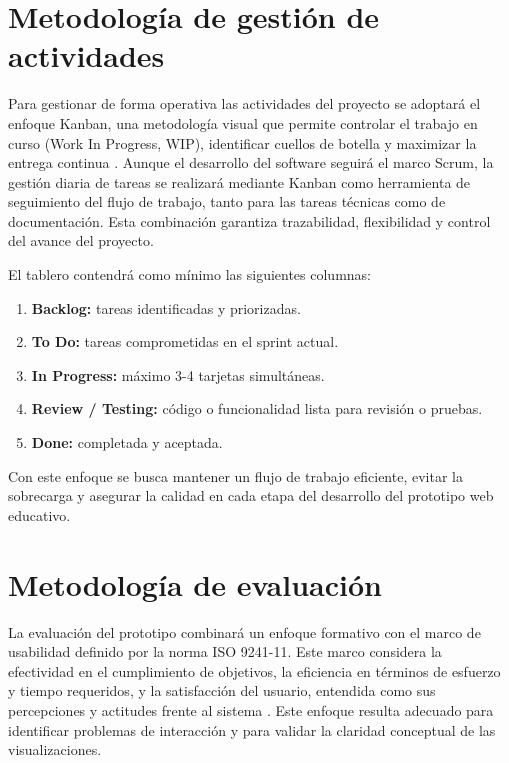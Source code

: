 \section{Metodología de gestión de actividades}

Para gestionar de forma operativa las actividades del proyecto se adoptará el enfoque Kanban, una metodología visual que permite controlar el trabajo en curso (Work In Progress, WIP), identificar cuellos de botella y maximizar la entrega continua \cite{KanbanScrum2010}. Aunque el desarrollo del software seguirá el marco Scrum, la gestión diaria de tareas se realizará mediante Kanban como herramienta de seguimiento del flujo de trabajo, tanto para las tareas técnicas como de documentación. Esta combinación garantiza trazabilidad, flexibilidad y control del avance del proyecto.

El tablero contendrá como mínimo las siguientes columnas:

\begin{enumerate}
    \item \textbf{Backlog:} tareas identificadas y priorizadas.
    \item \textbf{To Do:} tareas comprometidas en el sprint actual.
    \item \textbf{In Progress:} máximo 3-4 tarjetas simultáneas.
    \item \textbf{Review / Testing:} código o funcionalidad lista para revisión o pruebas.
    \item \textbf{Done:} completada y aceptada.
\end{enumerate}

Con este enfoque se busca mantener un flujo de trabajo eficiente, evitar la sobrecarga y asegurar la calidad en cada etapa del desarrollo del prototipo web educativo.

\section{Metodología de evaluación}

La evaluación del prototipo combinará un enfoque formativo con el marco de usabilidad definido por la norma ISO 9241-11. Este marco considera la efectividad en el cumplimiento de objetivos, la eficiencia en términos de esfuerzo y tiempo requeridos, y la satisfacción del usuario, entendida como sus percepciones y actitudes frente al sistema \cite{ISO9241-11}. Este enfoque resulta adecuado para identificar problemas de interacción y para validar la claridad conceptual de las visualizaciones.

